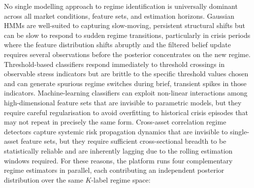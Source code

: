 \documentclass[12pt,openany]{book}
\numberwithin{equation}{chapter}
\theoremstyle{plain}
\theoremstyle{definition}
\theoremstyle{remark}
\begin{document}
No single modelling approach to regime identification is universally dominant across all market conditions, feature sets, and estimation horizons. Gaussian HMMs are well-suited to capturing slow-moving, persistent structural shifts but can be slow to respond to sudden regime transitions, particularly in crisis periods where the feature distribution shifts abruptly and the filtered belief update requires several observations before the posterior concentrates on the new regime. Threshold-based classifiers respond immediately to threshold crossings in observable stress indicators but are brittle to the specific threshold values chosen and can generate spurious regime switches during brief, transient spikes in those indicators. Machine-learning classifiers can exploit non-linear interactions among high-dimensional feature sets that are invisible to parametric models, but they require careful regularisation to avoid overfitting to historical crisis episodes that may not repeat in precisely the same form. Cross-asset correlation regime detectors capture systemic risk propagation dynamics that are invisible to single-asset feature sets, but they require sufficient cross-sectional breadth to be statistically reliable and are inherently lagging due to the rolling estimation windows required. For these reasons, the platform runs four complementary regime estimators in parallel, each contributing an independent posterior distribution over the same $K$-label regime space:
\end{document}
